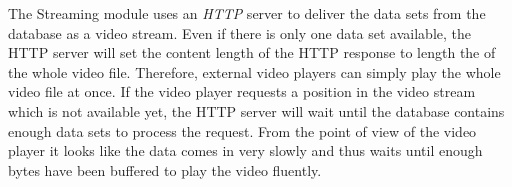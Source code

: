 The Streaming module uses an \emph{HTTP} server to deliver the data sets from the database as a video stream. Even if there is only one data set available, the HTTP server will set the content length of the HTTP response to length the of the whole video file. Therefore, external video players can simply play the whole video file at once. If the video player requests a position in the video stream which is not available yet, the HTTP server will wait until the database contains enough data sets to process the request. From the point of view of the video player it looks like the data comes in very slowly and thus waits until enough bytes have been buffered to play the video fluently.
